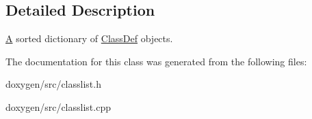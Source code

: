 \subsection{Detailed Description}
\mbox{\hyperlink{class_a}{A}} sorted dictionary of \mbox{\hyperlink{class_class_def}{Class\+Def}} objects. 

The documentation for this class was generated from the following files\+:\begin{DoxyCompactItemize}
\item 
doxygen/src/classlist.\+h\item 
doxygen/src/classlist.\+cpp\end{DoxyCompactItemize}
